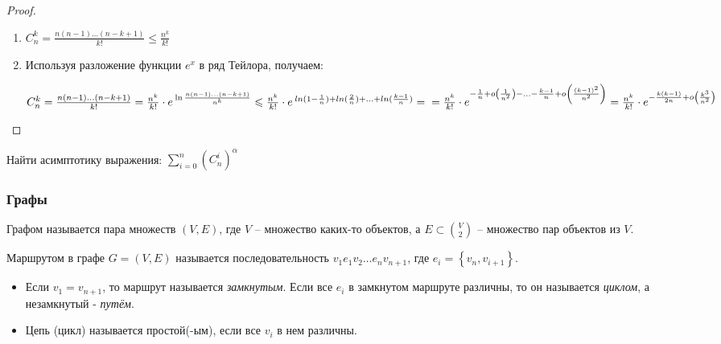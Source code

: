 \begin{proof}
	\begin{enumerate}
		
		\item $C_{n}^{k}=\frac{n(n-1) \ldots(n-k+1)}{k !} \leqslant \frac{n^{k}}{k !} $
		\item Используя разложение функции $e^x$ в ряд Тейлора, получаем:
		
		$
		C_{n}^{k}=\frac{n(n-1) \ldots(n-k+1)}{k !}=\frac{n^{k}}{k!} \cdot e^{\:\ln \frac{n(n-1) \ldots(n-k+1)}{n^{k}}} \leqslant
		 \frac{n^{k}}{k !} \cdot e^{\:ln(1 - \frac{1}{n}) + ln(\frac{2}{n})+\ldots+ln(\frac{k-1}{n})} = \\
		=\frac{n^{k}}{k!} \cdot e^{-\frac{1}{n} + o\left( \frac{1}{n^2}\right)  - \ldots  - \frac{k-1}{n} + o\left( \frac{( k-1)^2}{n^2}\right) } = \frac{n^{k}}{k!} \cdot e^{-\frac{k(k-1)}{2n} + o\left( \frac{k^3}{n^2}\right) }
		$
		
	\end{enumerate}
\end{proof}

\begin{brainer}
	Найти асимптотику выражения:  $ \sum_{i = 0}^{n} \left( C_{n}^{i}\right)^\alpha $
\end{brainer}


\subsubsection{Графы}

\begin{Def}
	Графом называется пара множеств $(V, E)$, где $V$ -- множество каких-то
	объектов, а $E \subset \binom{V}{2}$ -- множество пар объектов из $V$.
\end{Def} 


\begin{Def}
	Маршрутом в графе $G=(V, E)$ называется последовательность $v_{1} e_{1} v_{2} \ldots e_{n} v_{n+1}$, где $e_i = \left\lbrace v_{n}, v_{i+1} \right\rbrace $.
	
	\begin{itemize}
		\item Если $v_{1}=v_{n+1}$, то маршрут называется \emph{замкнутым}.
		Если все $e_{i}$ в замкнутом маршруте различны, то он называется \emph{циклом}, а незамкнутый - \emph{путём}.
		\item Цепь (цикл) называется простой(-ым), если все $v_i$ в нем различны.
	\end{itemize}
\end{Def} 


